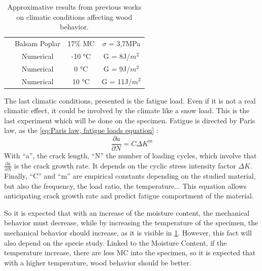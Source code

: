 \begin{table}[h]
\begin{tabular}{cccc}
		\multicolumn{1}{c}{\cellcolor[HTML]{C6E0B4}\cite{Huang2020}} & \multicolumn{1}{c}{Balsam Poplar} & \multicolumn{1}{c}{17\% MC} & \multicolumn{1}{c}{$\sigma$ = 3,7MPa} \\
		\multicolumn{1}{c}{\cellcolor[HTML]{F4B084}\cite{Seif2017}} & \multicolumn{1}{c}{Numerical} & \multicolumn{1}{c}{-10 °C} & \multicolumn{1}{c}{G = 8J/$m^{2}$} \\
		\multicolumn{1}{c}{\cellcolor[HTML]{F4B084}\cite{Seif2017}} & \multicolumn{1}{c}{Numerical} & \multicolumn{1}{c}{0 °C} & \multicolumn{1}{c}{G = 9J/$m^{2}$} \\
		\multicolumn{1}{c}{\cellcolor[HTML]{F4B084}\cite{Seif2017}} & \multicolumn{1}{c}{Numerical} & \multicolumn{1}{c}{10 °C} & \multicolumn{1}{c}{G = 11J/$m^{2}$} \\
	\end{tabular}
	\caption{Approximative results from previous works on climatic conditions affecting wood behavior.}
	\label{tab:ArticleResult}
\end{table}

The last climatic conditions, presented is the fatigue load. Even if it is not a real climatic effect, it could be involved by the climate like a snow load. This is the last experiment which will be done on the specimen. Fatigue is directed by Paris law, as the \ref{eq:Paris law, fatigue loads equation} :
\begin{equation}
	\frac{\partial a}{\partial N}=C \Delta K^{m}
	\label{eq:Paris law, fatigue loads equation}
\end{equation} 
With “a”, the crack length, “N” the number of loading cycles, which involve that $\frac{\partial a}{\partial N}$ is the crack growth rate. It depends on the cyclic stress intensity factor $\Delta K$. Finally, “C” and “m” are empirical constants depending on the studied material, but also the frequency, the load ratio, the temperature... This equation allows anticipating crack growth rate and predict fatigue comportment of the material.  

So it is expected that with an increase of the moisture content, the mechanical behavior must decrease, while by increasing the temperature of the specimen, the mechanical behavior should increase, as it is visible in \ref{tab:ArticleResult}. However, this fact will also depend on the specie study.
Linked to the Moisture Content, if the temperature increase, there are less MC into the specimen, so it is expected that with a higher temperature, wood behavior should be better.

